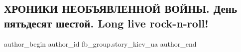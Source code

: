  
 
 
 
 
 
\subsection{ХРОНИКИ НЕОБЪЯВЛЕННОЙ ВОЙНЫ. День пятьдесят шестой. Long live rock-n-roll!}
\label{sec:20_04_2022.fb.fb_group.story_kiev_ua.1.rock_n_roll}
 
\ifcmt
 author_begin
   author_id fb_group.story_kiev_ua
 author_end
\fi
